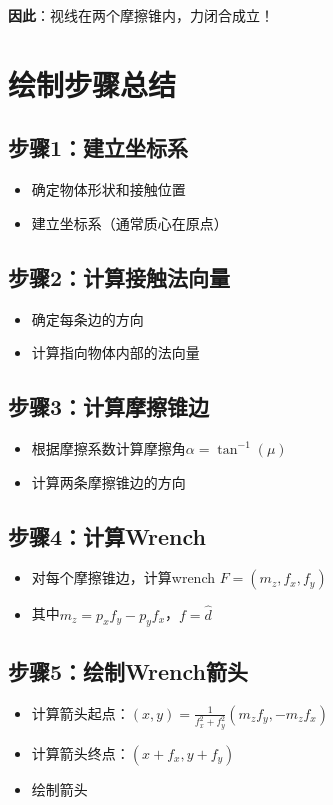 \documentclass[12pt,a4paper]{article}
\begin{document}
\textbf{因此}：视线在两个摩擦锥内，力闭合成立！

\section{绘制步骤总结}

\subsection{步骤1：建立坐标系}
\begin{itemize}
\item 确定物体形状和接触位置
\item 建立坐标系（通常质心在原点）
\end{itemize}

\subsection{步骤2：计算接触法向量}
\begin{itemize}
\item 确定每条边的方向
\item 计算指向物体内部的法向量
\end{itemize}

\subsection{步骤3：计算摩擦锥边}
\begin{itemize}
\item 根据摩擦系数计算摩擦角$\alpha = \tan^{-1}(\mu)$
\item 计算两条摩擦锥边的方向
\end{itemize}

\subsection{步骤4：计算Wrench}
\begin{itemize}
\item 对每个摩擦锥边，计算wrench $F = (m_z, f_x, f_y)$
\item 其中$m_z = p_x f_y - p_y f_x$，$f = \hat{d}$
\end{itemize}

\subsection{步骤5：绘制Wrench箭头}
\begin{itemize}
\item 计算箭头起点：$(x, y) = \frac{1}{f_x^2 + f_y^2} (m_z f_y, -m_z f_x)$
\item 计算箭头终点：$(x + f_x, y + f_y)$
\item 绘制箭头
\end{itemize}
\end{document}
